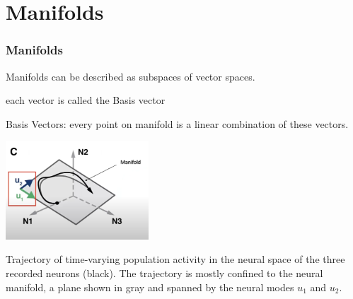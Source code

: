 \documentclass{beamer}
\begin{document}

\section{Manifolds}
\begin{frame}
\frametitle{\textbf{Manifolds} }

Manifolds can be described as subspaces of vector spaces.

each vector is called the Basis vector

Basis Vectors: every point on manifold is a linear combination of these vectors.


\centering
\begin{minipage}{1\textwidth}
    \centering
    \includegraphics[width=0.4\textwidth]{images/gallego_et_al-2017_01.PNG} %
\end{minipage}

Trajectory of time-varying population activity in the neural space of the three recorded neurons (black). The trajectory is mostly confined to the neural manifold, a plane shown in gray and spanned by the neural modes $u_1$ and $u_2$.

\end{frame}

\end{document}
